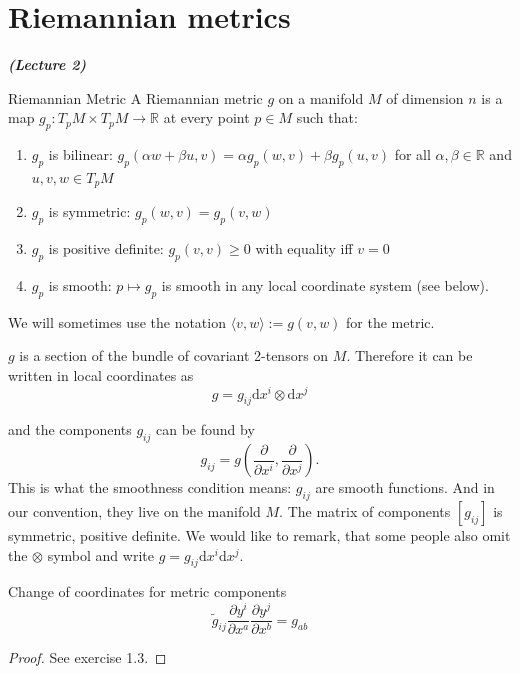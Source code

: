 


\newpage
\section{Riemannian metrics}

\vspace{0.4cm}\emph{\textbf{(Lecture 2)}}\\

\begin{colordef}{Riemannian Metric}{}
A Riemannian metric $g$ on a manifold $M$ of dimension $n$ is a map $g_p: T_pM \times T_pM \to \mathbb{R}$ at every point $p \in M$ such that:
\begin{enumerate}
    \item $g_p$ is bilinear: $g_p(\alpha w + \beta u, v) = \alpha g_p(w, v) + \beta g_p(u, v)$ for all $\alpha, \beta \in \mathbb{R}$ and $u, v, w \in T_pM$
    \item $g_p$ is symmetric: $g_p(w, v) = g_p(v, w)$
    \item $g_p$ is positive definite: $g_p(v, v) \geq 0$ with equality iff $v = 0$
    \item $g_p$ is smooth: $p \mapsto g_p$ is smooth in any local coordinate system (see below).
\end{enumerate}
\end{colordef}
We will sometimes use the notation $\langle v, w\rangle := g(v, w)$ for the metric.

$g$ is a section of the bundle of covariant 2-tensors on $M$. Therefore it can be written in local coordinates as
\begin{equation}
    \label{eq:metric_local_coordinates}
    g = g_{ij} \mathrm{d}x^i \otimes \mathrm{d}x^j
\end{equation}

and the components $g_{ij}$ can be found by
$$g_{ij} = g\left(\frac{\partial}{\partial x^i}, \frac{\partial}{\partial x^j}\right).$$
This is what the smoothness condition means: $g_{ij}$ are smooth functions. And in our convention, they live on the manifold $M$. The matrix of components $[g_{ij}]$ is symmetric, positive definite.
We would like to remark, that some people also omit the $\otimes$ symbol and write $g = g_{ij} \mathrm{d}x^i \mathrm{d}x^j$.

\begin{colorlem}{Change of coordinates for metric components}{}
\[
\tilde{g}_{ij} \frac{\partial y^i}{\partial x^a} \frac{\partial y^j}{\partial x^b} = g_{ab}
\]
\end{colorlem}
\begin{proof}
See exercise 1.3.
\end{proof}

